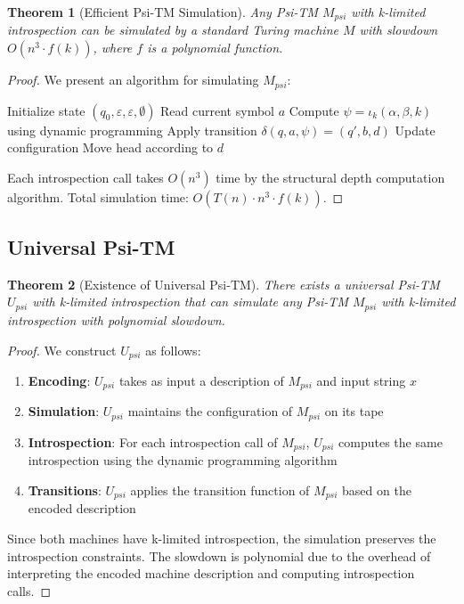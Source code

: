 \documentclass[11pt]{article}
\newtheorem{theorem}{Theorem}
\begin{document}
\begin{theorem}[Efficient Psi-TM Simulation]
Any Psi-TM $M_{psi}$ with k-limited introspection can be simulated by a standard Turing machine $M$ with slowdown $O(n^3 \cdot f(k))$, where $f$ is a polynomial function.
\end{theorem}

\begin{proof}
We present an algorithm for simulating $M_{psi}$:

\begin{algorithm}
\caption{Psi-TM Simulation}
\begin{algorithmic}
\STATE Initialize state $(q_0, \varepsilon, \varepsilon, \emptyset)$
    \STATE Read current symbol $a$
    \STATE Compute $\psi = \iota_k(\alpha, \beta, k)$ using dynamic programming
    \STATE Apply transition $\delta(q, a, \psi) = (q', b, d)$
    \STATE Update configuration
    \STATE Move head according to $d$
\ENDWHILE
\end{algorithmic}
\end{algorithm}

Each introspection call takes $O(n^3)$ time by the structural depth computation algorithm. Total simulation time: $O(T(n) \cdot n^3 \cdot f(k))$.
\end{proof}

\subsection{Universal Psi-TM}

\begin{theorem}[Existence of Universal Psi-TM]
There exists a universal Psi-TM $U_{psi}$ with k-limited introspection that can simulate any Psi-TM $M_{psi}$ with k-limited introspection with polynomial slowdown.
\end{theorem}

\begin{proof}
We construct $U_{psi}$ as follows:

\begin{enumerate}
\item \textbf{Encoding}: $U_{psi}$ takes as input a description of $M_{psi}$ and input string $x$
\item \textbf{Simulation}: $U_{psi}$ maintains the configuration of $M_{psi}$ on its tape
\item \textbf{Introspection}: For each introspection call of $M_{psi}$, $U_{psi}$ computes the same introspection using the dynamic programming algorithm
\item \textbf{Transitions}: $U_{psi}$ applies the transition function of $M_{psi}$ based on the encoded description
\end{enumerate}

Since both machines have k-limited introspection, the simulation preserves the introspection constraints. The slowdown is polynomial due to the overhead of interpreting the encoded machine description and computing introspection calls.
\end{proof}
\end{document}
